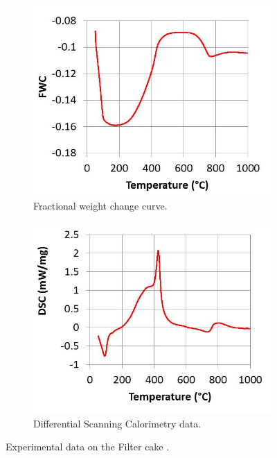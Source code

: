 \begin{figure}[h!]
\centering
\begin{subfigure}{.5\textwidth}
  \centering
  \includegraphics[width=\linewidth]{figures/TGA_exp.jpg}  
  \caption{Fractional weight change curve.}
  \label{fig:exp_fwc}
\end{subfigure}%
\begin{subfigure}{.5\textwidth}
  \centering
  \includegraphics[width=\linewidth]{figures/DSC_exp.jpg}
  \caption{Differential Scanning Calorimetry data.}
  \label{fig:exp_DSC}
\end{subfigure}
\label{fig:EXP_data}
\caption{Experimental data on the Filter cake \cite{Ray19}.}
\end{figure} 


